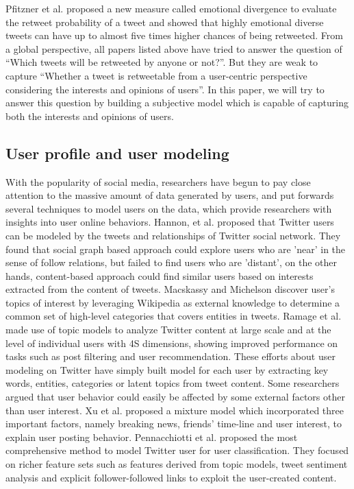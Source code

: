 \documentclass[preprint,times]{elsarticle}
\begin{document}
Pfitzner et al.\cite{conf/icwsm/PfitznerGS12} proposed a new measure called emotional divergence to evaluate the retweet probability of a tweet and showed that highly emotional diverse tweets can have up to almost five times higher chances of being retweeted.
From a global perspective, all papers listed above have tried to answer the question of ``Which tweets will be retweeted by anyone or not?''. 
But they are weak to capture ``Whether a tweet is retweetable from a user-centric perspective considering the interests and opinions of users''. 
In this paper, we will try to answer this question by building a subjective model which is capable of capturing both the interests and opinions of users.
\subsection{User profile and user modeling}
With the popularity of social media, researchers have begun to pay close attention to the massive amount of data generated by users, and put forwards several techniques to model users on the data, which provide researchers with insights into user online behaviors. 
Hannon, et al.\cite{Hannon:2010} proposed that Twitter users can be modeled by the tweets and relationships of Twitter social network.
They found that social graph based approach could explore users who are ’near’ in the sense of follow relations, but failed to find users who are ’distant’, on the other hands, content-based approach could find similar users based on interests extracted from the content of tweets. 
Macskassy and Michelson\cite{conf/icwsm/MacskassyM11} discover user’s topics of interest by leveraging Wikipedia as external knowledge to determine a common set of high-level categories that covers entities in tweets. 
Ramage et al.\cite{RamageEtAl:10} made use of topic models to analyze Twitter content at large scale and at the level of individual users with 4S dimensions, showing improved performance on tasks such as post filtering and user recommendation. 
These efforts about user modeling on Twitter have simply built model for each user by extracting key words, entities, categories or latent topics from tweet content. 
Some researchers argued that user behavior could easily be affected by some external factors other than user interest.
Xu et al.\cite{Xu:2012MUP} proposed a mixture model which incorporated three important factors, namely breaking news, friends’ time-line and user interest, to explain user posting behavior.
Pennacchiotti et al.\cite{Pennacchiotti:icwsm11} proposed the most comprehensive method to model Twitter user for user classification. They focused on richer feature sets such as features derived from topic models, tweet sentiment analysis and explicit follower-followed links to exploit the user-created content. 
\end{document}

